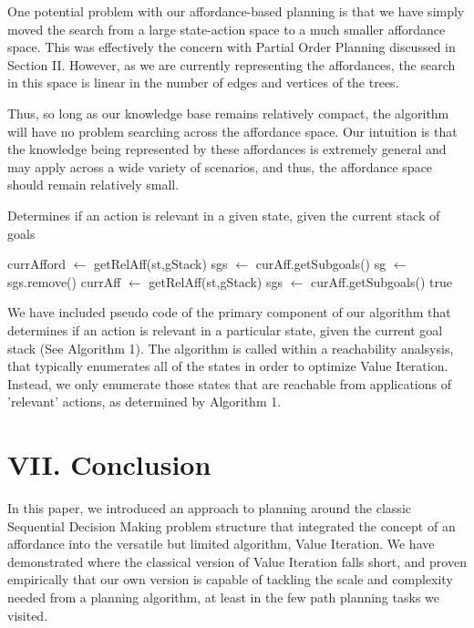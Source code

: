 \documentclass[a4paper]{article}
\begin{document}
One potential problem with our affordance-based planning is that we have simply moved the search from a large state-action space to a much smaller affordance space. This was effectively the concern with Partial Order Planning discussed in Section II. However, as we are currently representing the affordances, the search in this space is linear in the number of edges and vertices of the trees.

Thus, so long as our knowledge base remains relatively compact, the algorithm will have no problem searching across the affordance space. Our intuition is that the knowledge being represented by these affordances is extremely general and may apply across a wide variety of scenarios, and thus, the affordance space should remain relatively small.

\begin{algorithm}
	\caption{Determines if an action is relevant in a given state, given the current stack of goals}
	\begin{algorithmic}[1]
	\State currAfford $\gets$ getRelAff(st,gStack)
	\State sgs $\gets$ curAff.getSubgoals()
		\State sg $\gets$ sgs.remove()
					\State currAff $\gets$ getRelAff(st,gStack)
					\State sgs $\gets$ curAff.getSubgoals()
				\State \Return true
			\EndIf
		\EndIf
	\EndWhile
	\State {}
	\EndFunction
	\end{algorithmic}
\end{algorithm}

We have included pseudo code of the primary component of our algorithm that determines if an action is relevant in a particular state, given the current goal stack (See Algorithm 1). The algorithm is called within a reachability analsysis, that typically enumerates all of the states in order to optimize Value Iteration. Instead, we only enumerate those states that are reachable from applications of 'relevant' actions, as determined by Algorithm 1.

\section{VII. Conclusion}
In this paper, we introduced an approach to planning around the classic Sequential Decision Making problem structure that integrated the concept of an affordance into the versatile but limited algorithm, Value Iteration. We have demonstrated where the classical version of Value Iteration falls short, and proven empirically that our own version is capable of tackling the scale and complexity needed from a planning algorithm, at least in the few path planning tasks we visited.
\end{document}
